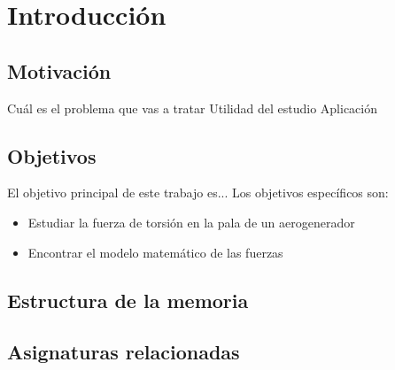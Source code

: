 \section{Introducción}

\subsection{Motivación}

Cuál es el problema que vas a tratar
Utilidad del estudio
Aplicación

\subsection{Objetivos}
El objetivo principal de este trabajo es...
Los objetivos específicos son:
\begin{itemize}
    \item Estudiar la fuerza de torsión en la pala de un aerogenerador
    \item Encontrar el modelo matemático de las fuerzas
\end{itemize}

\subsection{Estructura de la memoria}

\subsection{Asignaturas relacionadas}